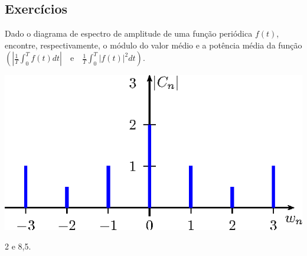 \subsection*{Exercícios}
\begin{exer}Dado o diagrama de espectro de amplitude de uma função periódica $f(t)$, encontre, respectivamente, o módulo do valor médio e a potência média da função $\left(\left|\frac{1}{T}\int_0^Tf(t)dt\right|\quad\text{e}\quad \frac{1}{T}\int_0^T|f(t)|^2dt\right)$.\\
\begin{center}
\includegraphics{cap_propriedades_series/pics/figura_4}
\end{center}
\end{exer}
\begin{resp} 2 e 8,5.
\end{resp}





